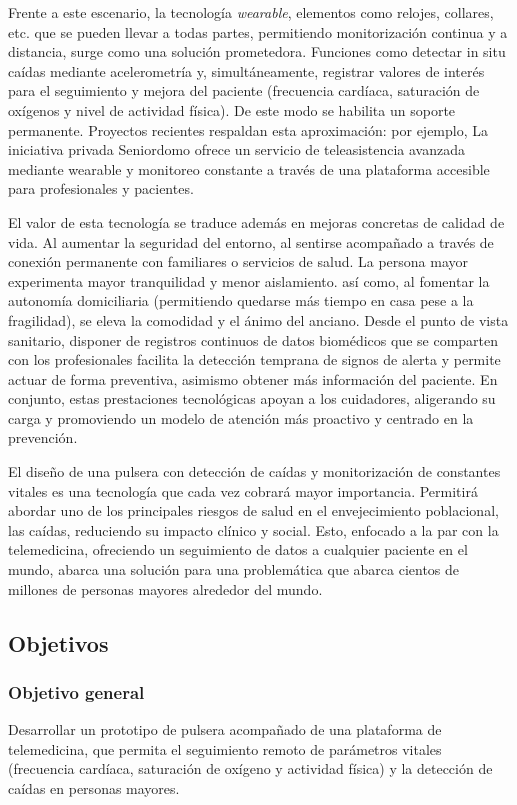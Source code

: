 \documentclass[12pt, a4paper]{article}
\begin{document}
    Frente a este escenario, la tecnología \emph{wearable}, elementos como relojes, collares, etc. que se pueden llevar a todas partes, permitiendo monitorización continua y a distancia, surge como una solución prometedora. Funciones como detectar in situ caídas mediante acelerometría y, simultáneamente, registrar valores de interés para el seguimiento y mejora del paciente (frecuencia cardíaca, saturación de oxígenos y nivel de actividad física). De este modo se habilita un soporte permanente. Proyectos recientes respaldan esta aproximación: por ejemplo, La iniciativa privada Seniordomo ofrece un servicio de teleasistencia avanzada mediante wearable y monitoreo constante a través de una plataforma accesible para profesionales y pacientes\cite{seniordomo}. 
    
    El valor de esta tecnología se traduce además en mejoras concretas de calidad de vida. Al aumentar la seguridad del entorno, al sentirse acompañado a través de conexión permanente con familiares o servicios de salud. La persona mayor experimenta mayor tranquilidad y menor aislamiento\cite{Reina2024}. así como, al fomentar la autonomía domiciliaria (permitiendo quedarse más tiempo en casa pese a la fragilidad), se eleva la comodidad y el ánimo del anciano\cite{Reina2024}. Desde el punto de vista sanitario, disponer de registros continuos de datos biomédicos que se comparten con los profesionales facilita la detección temprana de signos de alerta y permite actuar de forma preventiva, asimismo obtener más información del paciente. En conjunto, estas prestaciones tecnológicas apoyan a los cuidadores, aligerando su carga y promoviendo un modelo de atención más proactivo y centrado en la prevención.
    
    El diseño de una pulsera con detección de caídas y monitorización de constantes vitales es una tecnología que cada vez cobrará mayor importancia. Permitirá abordar uno de los principales riesgos de salud en el envejecimiento poblacional, las caídas, reduciendo su impacto clínico y social. Esto, enfocado a la par con la telemedicina, ofreciendo un seguimiento de datos a cualquier paciente en el mundo, abarca una solución para una problemática que abarca cientos de millones de personas mayores alrededor del mundo.

	\subsection{Objetivos}
	
	\subsubsection{Objetivo general}
	Desarrollar un prototipo de pulsera acompañado de una plataforma de telemedicina, que permita el seguimiento remoto de parámetros vitales (frecuencia cardíaca, saturación de oxígeno y actividad física) y la detección de caídas en personas mayores.
	
\end{document}

